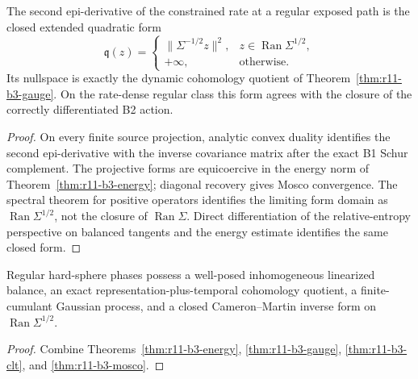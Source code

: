 \begin{theorem}
\label{thm:r11-b3-mosco}
The second epi-derivative of the constrained rate at a regular exposed path is
the closed extended quadratic form
\[
 \mathfrak q(z)=
 \begin{cases}
  \|\Sigma^{-1/2}z\|^2,&z\in\operatorname{Ran}\Sigma^{1/2},\\
  +\infty,&\text{otherwise}.
 \end{cases}
\]
Its nullspace is exactly the dynamic cohomology quotient of
Theorem~\ref{thm:r11-b3-gauge}.  On the rate-dense regular class this form
agrees with the closure of the correctly differentiated B2 action.
\end{theorem}

\begin{proof}
On every finite source projection, analytic convex duality identifies the
second epi-derivative with the inverse covariance matrix after the exact B1
Schur complement.  The projective forms are equicoercive in the energy norm of
Theorem~\ref{thm:r11-b3-energy}; diagonal recovery gives Mosco convergence.
The spectral theorem for positive operators identifies the limiting form
domain as $\operatorname{Ran}\Sigma^{1/2}$, not the closure of
$\operatorname{Ran}\Sigma$.  Direct differentiation of the relative-entropy
perspective on balanced tangents and the energy estimate identifies the same
closed form.
\end{proof}

\begin{theorem}
\label{thm:r11-b3-main}
Regular hard-sphere phases possess a well-posed inhomogeneous linearized
balance, an exact representation-plus-temporal cohomology quotient, a
finite-cumulant Gaussian process, and a closed Cameron--Martin inverse form on
$\operatorname{Ran}\Sigma^{1/2}$.
\end{theorem}

\begin{proof}
Combine Theorems~\ref{thm:r11-b3-energy},
\ref{thm:r11-b3-gauge}, \ref{thm:r11-b3-clt}, and
\ref{thm:r11-b3-mosco}.
\end{proof}
